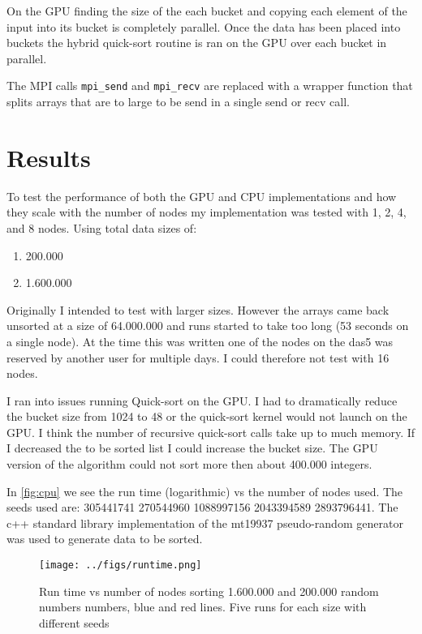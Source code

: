 \documentclass[lang=en, hanging-titles=true]{skrapport}
\begin{document}
On the GPU finding the size of the each bucket and copying each element of the input into its bucket is completely parallel. Once the data has been placed into buckets the hybrid quick-sort routine is ran on the GPU over each bucket in parallel.

The MPI calls \texttt{mpi\_send} and \texttt{mpi\_recv} are replaced with a wrapper function that splits arrays that are to large to be send in a single send or recv call.

\section{Results}
To test the performance of both the GPU and CPU implementations and how they scale with the number of nodes my implementation was tested with 1, 2, 4, and 8 nodes. Using total data sizes of:

\begin{enumerate}
	\item 200.000
	\item 1.600.000
\end{enumerate}

Originally I intended to test with larger sizes. However the arrays came back unsorted at a size of 64.000.000 and runs started to take too long (53 seconds on a single node). At the time this was written one of the nodes on the das5 was reserved by another user for multiple days. I could therefore not test with 16 nodes.

I ran into issues running Quick-sort on the GPU. I had to dramatically reduce the bucket size from 1024 to 48 or the quick-sort kernel would not launch on the GPU. I think the number of recursive quick-sort calls take up to much memory. If I decreased the to be sorted list I could increase the bucket size. The GPU version of the algorithm could not sort more then about 400.000 integers.

In \autoref{fig:cpu} we see the run time (logarithmic) vs the number of nodes used. The seeds used are: 305441741 270544960 1088997156 2043394589 2893796441. The c++ standard library implementation of the mt19937 pseudo-random generator was used to generate data to be sorted.

\begin{figure}[htbp]
	\centering
	\texttt{[image: ../figs/runtime.png]}
	\caption{Run time vs number of nodes sorting 1.600.000 and 200.000 random numbers numbers, blue and red lines. Five runs for each size with different seeds}
	\label{fig:cpu}
\end{figure}
\end{document}
